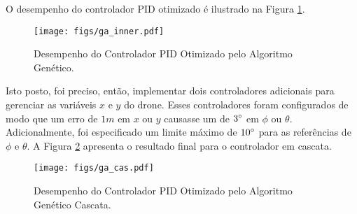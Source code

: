 O desempenho do controlador PID otimizado é ilustrado na Figura \ref{fig:ga_performance}.
\begin{figure}[h!]
    \centering
    \caption{Desempenho do Controlador PID Otimizado pelo Algoritmo Genético.}
    \texttt{[image: figs/ga\_inner.pdf]}
    \label{fig:ga_performance}
\end{figure}

Isto posto, foi preciso, então, implementar dois controladores adicionais para gerenciar as 
variáveis $x$ e $y$ do drone. Esses controladores foram configurados de modo que um erro de $1m$ 
em $x$ ou $y$ causasse um de $3\degree$ em $\phi$ ou $\theta$. Adicionalmente, foi 
especificado um limite máximo de $10\degree$ para as referências de $\phi$ e $\theta$. A Figura 
\ref{fig:ga_outer_performance} apresenta o resultado final para o controlador em cascata. 
\begin{figure}[h!]
    \centering
    \caption{Desempenho do Controlador PID Otimizado pelo Algoritmo Genético Cascata.}
    \texttt{[image: figs/ga\_cas.pdf]}
    \label{fig:ga_outer_performance}
\end{figure}